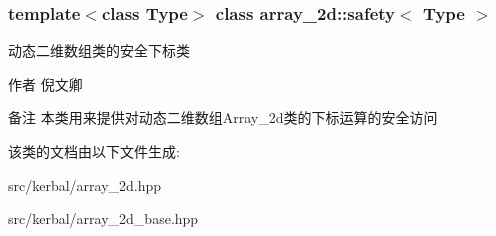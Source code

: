 \subsubsection*{template$<$class Type$>$\newline
class array\+\_\+2d\+::safety$<$ Type $>$}

动态二维数组类的安全下标类 

\begin{DoxyAuthor}{作者}
倪文卿 
\end{DoxyAuthor}
\begin{DoxyRemark}{备注}
本类用来提供对动态二维数组\+Array\+\_\+2d类的下标运算的安全访问 
\end{DoxyRemark}


该类的文档由以下文件生成\+:\begin{DoxyCompactItemize}
\item 
src/kerbal/array\+\_\+2d.\+hpp\item 
src/kerbal/array\+\_\+2d\+\_\+base.\+hpp\end{DoxyCompactItemize}
